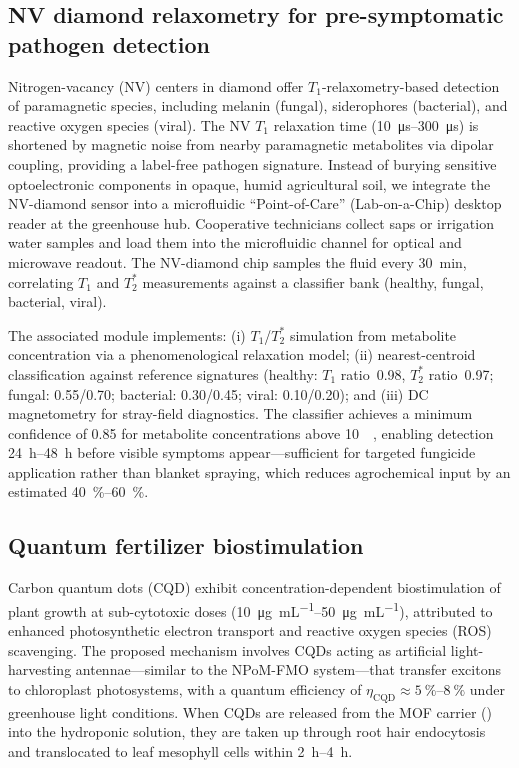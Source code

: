 \documentclass[11pt,a4paper]{article}
\begin{document}
\subsection{NV diamond relaxometry for pre-symptomatic pathogen detection}
\label{SI-sec:nv_diamond}

Nitrogen-vacancy (NV) centers in diamond offer $T_1$-relaxometry-based detection of paramagnetic species, including melanin (fungal), siderophores (bacterial), and reactive oxygen species (viral). The NV $T_1$ relaxation time (\qtyrange{10}{300}{\us}) is shortened by magnetic noise from nearby paramagnetic metabolites via dipolar coupling, providing a label-free pathogen signature. Instead of burying sensitive optoelectronic components in opaque, humid agricultural soil, we integrate the NV-diamond sensor into a microfluidic ``Point-of-Care'' (Lab-on-a-Chip) desktop reader at the greenhouse hub. Cooperative technicians collect saps or irrigation water samples and load them into the microfluidic channel for optical and microwave readout. The NV-diamond chip samples the fluid every \qty{30}{\minute}, correlating $T_1$ and $T_2^*$ measurements against a classifier bank (healthy, fungal, bacterial, viral).

The associated module implements: (i) $T_1$/$T_2^*$ simulation from metabolite concentration via a phenomenological relaxation model; (ii) nearest-centroid classification against reference signatures (healthy: $T_1$ ratio~0.98, $T_2^*$ ratio~0.97; fungal: 0.55/0.70; bacterial: 0.30/0.45; viral: 0.10/0.20); and (iii) DC magnetometry for stray-field diagnostics. The classifier achieves a minimum confidence of 0.85 for metabolite concentrations above \qty{10}{\micro\molar}, enabling detection \qtyrange{24}{48}{\hour} before visible symptoms appear---sufficient for targeted fungicide application rather than blanket spraying, which reduces agrochemical input by an estimated \qtyrange{40}{60}{\percent}.

\subsection{Quantum fertilizer biostimulation}
\label{SI-sec:quantum_fertiliser}

Carbon quantum dots (CQD) exhibit concentration-dependent biostimulation of plant growth at sub-cytotoxic doses (\qtyrange{10}{50}{\ug\per\mL}), attributed to enhanced photosynthetic electron transport and reactive oxygen species (ROS) scavenging. The proposed mechanism involves CQDs acting as artificial light-harvesting antennae---similar to the NPoM-FMO system---that transfer excitons to chloroplast photosystems, with a quantum efficiency of $\eta_{\mathrm{CQD}} \approx \qtyrange{5}{8}{\percent}$ under greenhouse light conditions. When CQDs are released from the MOF carrier () into the hydroponic solution, they are taken up through root hair endocytosis and translocated to leaf mesophyll cells within \qtyrange{2}{4}{\hour}.
\end{document}

